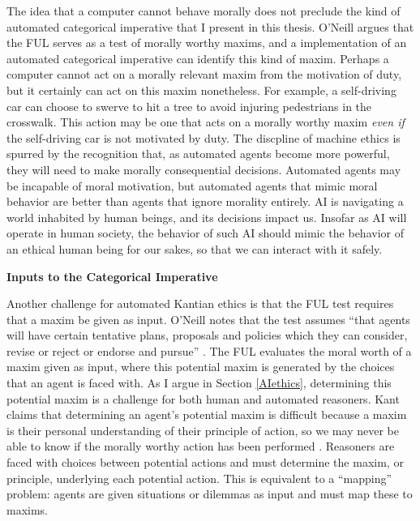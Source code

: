 \begin{isabellebody}
\begin{isamarkuptext}
The idea that a computer cannot behave morally does not preclude the kind 
of automated categorical imperative that I present in this thesis. O'Neill argues that the FUL
serves as a test of morally worthy maxims, and a implementation of an automated categorical imperative can 
identify this kind of maxim. Perhaps a computer cannot act on a morally relevant maxim from the motivation of duty, 
but it certainly can act on this maxim nonetheless. For example, a self-driving car can choose to swerve to hit a tree
to avoid injuring pedestrians in the crosswalk. This action may be one that acts on a morally worthy maxim
\emph{even if} the self-driving car is not motivated by duty. The discpline of machine ethics is
spurred by the recognition that, as automated agents become more powerful, they will need to make
morally consequential decisions. Automated agents may be incapable of moral motivation, but automated agents that mimic
moral behavior are better than agents that ignore morality entirely. AI is navigating a world 
inhabited by human beings, and its decisions impact us. Insofar as AI will operate in human society, 
the behavior of such AI should mimic the behavior of an ethical human being for our sakes, so that we 
can interact with it safely. 

\medskip 

\noindent \textbf{Inputs to the Categorical Imperative}

Another challenge for automated Kantian ethics is that the FUL test requires that
a maxim be given as input. O'Neill notes that the test assumes ``that agents will have certain tentative 
plans, proposals and policies which they can consider, revise or reject or endorse and pursue'' \citep[343]{oneilluniversallaws}.
The FUL evaluates the moral worth of a maxim given as input, where this potential maxim is generated by 
the choices that an agent is faced with. As I argue in Section \ref{AIethics}, determining this potential maxim is a challenge for both human
and automated reasoners. Kant claims that determining an agent's potential maxim is difficult because a maxim is their
personal understanding of their principle of action, so we may never be able 
to know if the morally worthy action has been performed \cite[345]{oneilluniversallaws}. Reasoners are faced with
choices between potential actions and must determine the maxim, or principle, underlying each potential action.
This is equivalent to a ``mapping'' problem: agents are given situations or dilemmas as input and must map
these to maxims.


\end{isamarkuptext}
\end{isabellebody}
